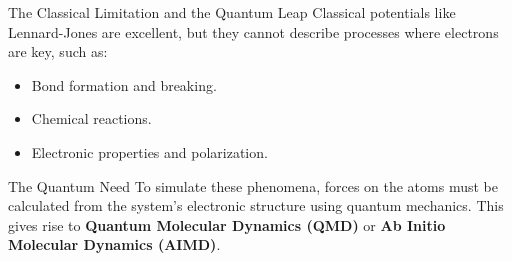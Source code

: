 \begin{frame}{The Classical Limitation and the Quantum Leap}
    Classical potentials like Lennard-Jones are excellent, but they cannot describe processes where electrons are key, such as:
    \pause
    \begin{itemize}
        \item Bond formation and breaking.
        \item Chemical reactions.
        \item Electronic properties and polarization.
    \end{itemize}
    \pause
    \bigskip
    
    \begin{block}{The Quantum Need}
        To simulate these phenomena, forces on the atoms must be calculated from the system's electronic structure using quantum mechanics. This gives rise to \textbf{Quantum Molecular Dynamics (QMD)} or \textbf{Ab Initio Molecular Dynamics (AIMD)}.
    \end{block}
\end{frame}
